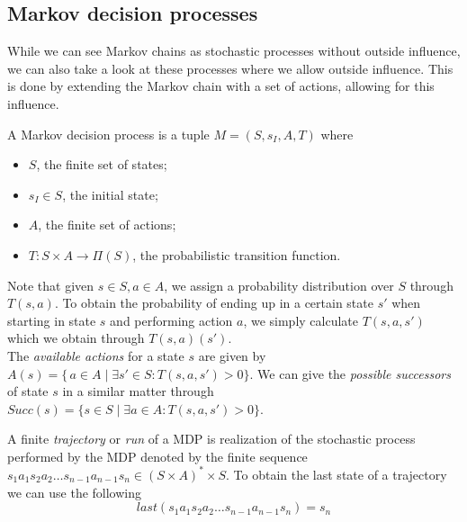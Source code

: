 \subsection{Markov decision processes}
While we can see Markov chains as stochastic processes without outside influence, we can also take a look at these processes where we allow outside influence. This is done by extending the Markov chain with a set of actions, allowing for this influence. 
\begin{definition}[MDP]
	A Markov decision process is a tuple $M=(S,s_I,A,T)$ where 
	\begin{itemize}
		\item $S$, the finite set of states;
		\item $s_I\in S$, the initial state;
		\item $A$, the finite set of actions;
		\item $T:S\times A\to \Pi(S)$, the probabilistic transition function.
	\end{itemize}
\end{definition}

Note that given $s\in S,a\in A$, we assign a probability distribution over $S$ through $T(s,a)$. To obtain the probability of ending up in a certain state $s'$ when starting in state $s$ and performing action $a$, we simply calculate $T(s,a,s')$ which we obtain through $T(s,a)(s')$.\\

The \textit{available actions} for a state $s$ are given by $A(s)=\{\,a\in A\mid \exists s'\in S: T(s,a,s')>0\}$. We can give the \textit{possible successors} of state $s$ in a similar matter through $Succ(s)=\{s\in S\mid\exists a\in A : T(s,a,s')>0\}$.

A finite \textit{trajectory} or \textit{run} of a MDP is realization of the stochastic process performed by the MDP denoted by the finite sequence $s_1 a_1 s_2 a_2\dots s_{n-1} a_{n-1} s_n \in (S\times A)^*\times S$. To obtain the last state of a trajectory we can use the following \[last(s_1 a_1 s_2 a_2\dots s_{n-1} a_{n-1} s_n)=s_n\]

